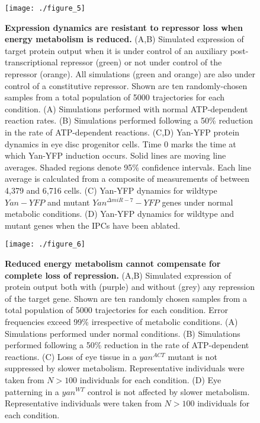 \begin{figure}[h!]
\label{fig:metabolism:fig5}
\centering
\texttt{[image: ./figure\_5]}
\caption[Expression dynamics are resistant to repressor loss when energy metabolism is reduced.]{\textbf{Expression dynamics are resistant to repressor loss when energy metabolism is reduced.} (A,B) Simulated expression of target protein output when it is under control of an auxiliary post-transcriptional repressor (green) or not under control of the repressor (orange). All simulations (green and orange) are also under control of a constitutive repressor. Shown are ten randomly-chosen samples from a total population of 5000 trajectories for each condition. (A) Simulations performed with normal ATP-dependent reaction rates. (B) Simulations performed following a 50\% reduction in the rate of ATP-dependent reactions. (C,D) Yan-YFP protein dynamics in eye disc progenitor cells. Time 0 marks the time at which Yan-YFP induction occurs. Solid lines are moving line averages. Shaded regions denote 95\% confidence intervals. Each line average is calculated from a composite of measurements of between 4,379 and 6,716 cells. (C) Yan-YFP dynamics for wildtype $Yan-YFP$ and mutant $Yan^{\Delta miR-7}-YFP$ genes under normal metabolic conditions. (D) Yan-YFP dynamics for wildtype and mutant genes when the IPCs have been ablated.}
\end{figure}

\begin{figure}[h!]
\label{fig:metabolism:fig6}
\centering
\texttt{[image: ./figure\_6]}
\caption[Reduced energy metabolism cannot compensate for complete loss of repression.]{\textbf{Reduced energy metabolism cannot compensate for complete loss of repression.} (A,B) Simulated expression of protein output both with (purple) and without (grey) any repression of the target gene. Shown are ten randomly chosen samples from a total population of 5000 trajectories for each condition. Error frequencies exceed 99\% irrespective of metabolic conditions. (A) Simulations performed under normal conditions. (B) Simulations performed following a 50\% reduction in the rate of ATP-dependent reactions. (C) Loss of eye tissue in a $yan^{ACT}$ mutant is not suppressed by slower metabolism. Representative individuals were taken from $N>100$ individuals for each condition. (D) Eye patterning in a $yan^{WT}$ control is not affected by slower metabolism. Representative individuals were taken from $N>100$ individuals for each condition.}
\end{figure}

